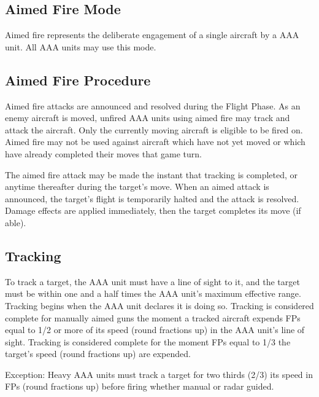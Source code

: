 \subsection{Aimed Fire Mode}

Aimed fire represents the deliberate engagement of a single aircraft by a AAA unit. All AAA units may use this mode.

\subsection{Aimed Fire Procedure} Aimed fire attacks are announced and resolved during the Flight Phase. As an enemy aircraft is moved, unfired AAA units using aimed fire may track and attack the aircraft. Only the currently moving aircraft is eligible to be fired on. Aimed fire may not be used against aircraft which have not yet moved or which have already completed their moves that game turn.

The aimed fire attack may be made the instant that tracking is completed, or anytime thereafter during the target's move. When an aimed attack is announced, the target's flight is temporarily halted and the attack is resolved. Damage effects are applied immediately, then the target completes its move (if able).

\subsection{Tracking} To track a target, the AAA unit must have a line of sight to it, and the target must be within one and a half times the AAA unit's maximum effective range. Tracking begins when the AAA unit declares it is doing so. Tracking is considered complete for manually aimed guns the moment a tracked aircraft expends FPs equal to 1/2 or more of its speed (round fractions up) in the AAA unit's line of sight. Tracking is considered complete for  the moment FPs equal to 1/3 the target's speed (round fractions up) are expended.

Exception: Heavy AAA units must track a target for two thirds (2/3) its speed in FPs (round fractions up) before firing whether manual or radar guided.


